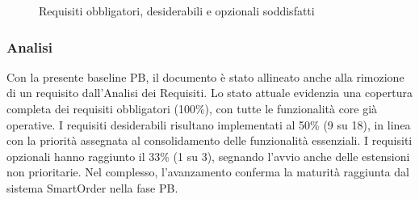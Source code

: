 \documentclass[a4paper,11pt,oneside]{scrartcl}
\begin{document}
\begin{figure}[H]
\centering


\caption{Requisiti obbligatori, desiderabili e opzionali soddisfatti}
\label{fig:requisiti_soddisfatti}
\end{figure}

\subsubsection*{Analisi}

Con la presente baseline PB, il documento è stato allineato anche alla rimozione di un requisito dall'Analisi dei Requisiti. Lo stato attuale evidenzia una copertura completa dei requisiti obbligatori (100\%), con tutte le funzionalità core già operative. I requisiti desiderabili risultano implementati al 50\% (9 su 18), in linea con la priorità assegnata al consolidamento delle funzionalità essenziali. I requisiti opzionali hanno raggiunto il 33\% (1 su 3), segnando l'avvio anche delle estensioni non prioritarie. Nel complesso, l'avanzamento conferma la maturità raggiunta dal sistema SmartOrder nella fase PB.
\end{document}
